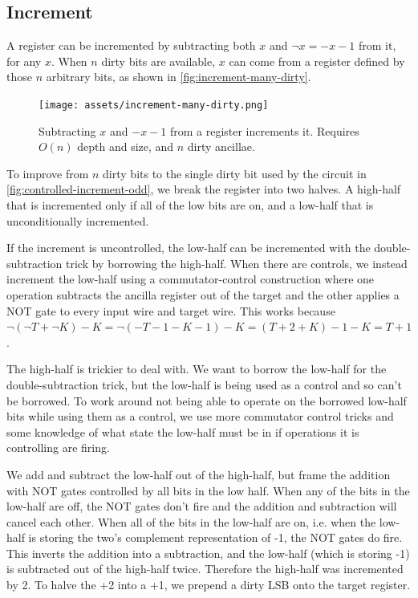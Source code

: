 \documentclass[twocolumn,longbibliography]{quantumarticle-customized}
\begin{document}
\subsection{Increment}

A register can be incremented by subtracting both $x$ and $\neg x = -x-1$ from it, for any $x$.
When $n$ dirty bits are available, $x$ can come from a register defined by those $n$ arbitrary bits, as shown in \autoref{fig:increment-many-dirty}.

\begin{figure}
  \centering
  \texttt{[image: assets/increment-many-dirty.png]}
  \caption{ Subtracting $x$ and $-x-1$ from a register increments it. Requires $O(n)$ depth and size, and $n$ dirty ancillae.}
  \label{fig:increment-many-dirty}
\end{figure}

To improve from $n$ dirty bits to the single dirty bit used by the circuit in \autoref{fig:controlled-increment-odd}, we break the register into two halves.
A high-half that is incremented only if all of the low bits are on, and a low-half that is unconditionally incremented.

If the increment is uncontrolled, the low-half can be incremented with the double-subtraction trick by borrowing the high-half.
When there are controls, we instead increment the low-half using a commutator-control construction where one operation subtracts the ancilla register out of the target and the other applies a NOT gate to every input wire and target wire.
This works because $\lnot (\lnot T + \lnot K) - K = \lnot (-T - 1 - K - 1) - K = (T+2+K) - 1 - K = T + 1$.

The high-half is trickier to deal with.
We want to borrow the low-half for the double-subtraction trick, but the low-half is being used as a control and so can't be borrowed.
To work around not being able to operate on the borrowed low-half bits while using them as a control, we use more commutator control tricks and some knowledge of what state the low-half must be in if operations it is controlling are firing.

We add and subtract the low-half out of the high-half, but frame the addition with NOT gates controlled by all bits in the low half.
When any of the bits in the low-half are off, the NOT gates don't fire and the addition and subtraction will cancel each other.
When all of the bits in the low-half are on, i.e. when the low-half is storing the two's complement representation of -1, the NOT gates do fire.
This inverts the addition into a subtraction, and the low-half (which is storing -1) is subtracted out of the high-half twice.
Therefore the high-half was incremented by 2.
To halve the +2 into a +1, we prepend a dirty LSB onto the target register.
\end{document}

